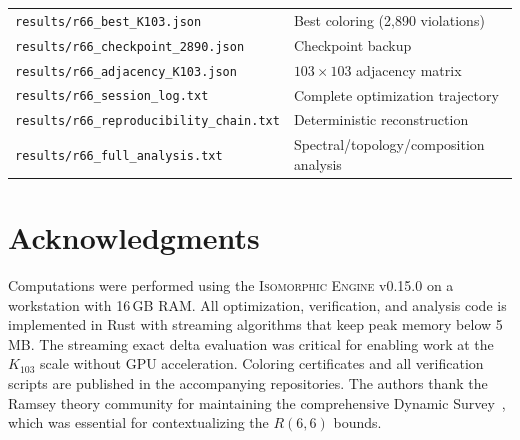 \documentclass[11pt,a4paper]{article}
\theoremstyle{plain}
\theoremstyle{remark}
\begin{document}
\begin{tcolorbox}[colback=reedsbg, colframe=accent!50, fontupper=\small,
  title={\small\bfseries Output Files}, coltitle=white,
  colbacktitle=accent]
\begin{tabular}{@{}ll@{}}
\texttt{results/r66\_best\_K103.json} & Best coloring (2{,}890 violations) \\
\texttt{results/r66\_checkpoint\_2890.json} & Checkpoint backup \\
\texttt{results/r66\_adjacency\_K103.json} & $103 \times 103$ adjacency matrix \\
\texttt{results/r66\_session\_log.txt} & Complete optimization trajectory \\
\texttt{results/r66\_reproducibility\_chain.txt} & Deterministic reconstruction \\
\texttt{results/r66\_full\_analysis.txt} & Spectral/topology/composition analysis \\
\end{tabular}
\end{tcolorbox}

\section*{Acknowledgments}

Computations were performed using the \textsc{Isomorphic Engine}
v0.15.0 on a workstation with 16\,GB RAM.
All optimization, verification, and analysis code is implemented in
Rust with streaming algorithms that keep peak memory below 5\,MB.
The streaming exact delta evaluation was critical for enabling work
at the $K_{103}$ scale without GPU acceleration.
Coloring certificates and all verification scripts are published in
the accompanying repositories.
The authors thank the Ramsey theory community for maintaining the
comprehensive Dynamic Survey~\cite{radziszowski2021}, which was
essential for contextualizing the $R(6,6)$ bounds.

\end{document}
